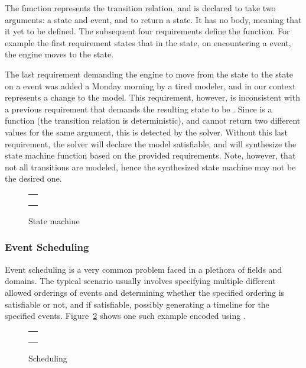 The function  represents the transition relation, and 
is declared to take two arguments: a state and event, and to return a state. 
It has no body, meaning that it yet to be defined. The subsequent four  
requirements define the 
 function. For example the first requirement states that
in the  state, on encountering a  event, the engine moves 
to the  state. 

The last requirement demanding the engine to move from the  state to 
the  state on a  event was added a Monday morning by a tired
modeler, and in our context represents a change to the model.
This requirement, however, is inconsistent with a previous requirement 
that demands the resulting state to be .
Since  is a function (the transition relation is deterministic), and 
cannot return two
different values for the same argument, this is detected by the solver. 
Without this last requirement, the solver will declare the model satisfiable, and 
will synthesize the state machine function based on the provided requirements.
Note, however, that not all transitions are modeled, hence the synthesized state
machine may not be the desired one.

\begin{figure}
\centering
\begin{tabular}{c}
\hline \\
 \\ \\
\hline
\end{tabular}
\caption{State machine}
\label{fig:statemachine}
\end{figure}

\subsubsection{Event Scheduling}

Event scheduling is a very common problem faced in a plethora of
fields and domains. The typical scenario usually involves specifying
multiple different allowed orderings of events and determining whether
the specified ordering is satisfiable or not, and if satisfiable,
possibly generating a timeline for the specified events.
Figure~\ref{fig:scheduling} shows one such example encoded using
\Klang{}.

\begin{figure}
\centering
\begin{tabular}{c}
\hline \\
 \\ \\
\hline
\end{tabular}
\caption{Scheduling}
\label{fig:scheduling}
\end{figure}

